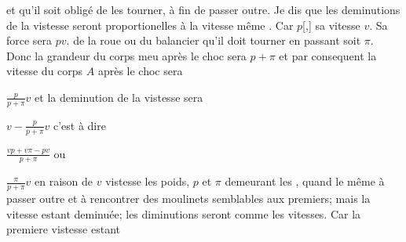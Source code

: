 et qu'il soit oblig\'{e} de les tourner, \`{a} fin de passer 
%
%
outre. Je dis que les deminutions de la vistesse seront proportionelles \`{a} la vitesse m\^{e}me .
Car 
$\displaystyle p$[,] sa vitesse $\displaystyle v$. Sa force sera $\displaystyle pv$.
 de la roue ou du balancier
qu'il doit tourner en passant soit $\displaystyle \pi$. Donc la grandeur du corps meu apr\`{e}s le choc\protect{} sera $\displaystyle p + \pi$ et par consequent la 
%
%
vitesse du corps $\displaystyle A$ apr\`{e}s le choc sera \rule[-4mm]{0mm}{10mm}$\displaystyle \frac{p}{p + \pi}v$ et la deminution de la vistesse sera \rule[-4mm]{0mm}{10mm}$\displaystyle v - \frac{p}{p + \pi}v$ c'est \`{a} dire \rule[-4mm]{0mm}{10mm}$\displaystyle \frac{vp + v\pi - pv}{p + \pi}$ ou \rule[-4mm]{0mm}{10mm}$\displaystyle \frac{\pi}{p+\pi}v$
en raison de $\displaystyle v$ vistesse 
les poids, $\displaystyle p$ et $\displaystyle \pi$ demeurant les ,
quand le m\^{e}me 
\`{a} passer outre et \`{a} rencontrer des moulinets semblables aux premiers; mais la vitesse estant deminu\'{e}e; les diminutions 
seront comme les vitesses. Car la premiere vistesse estant 
